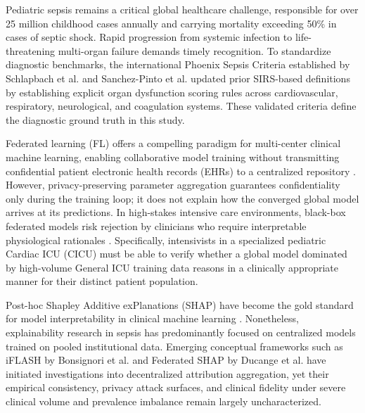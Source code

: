 \documentclass[runningheads]{llncs}
\begin{document}
Pediatric sepsis remains a critical global healthcare challenge, responsible for over 25 million childhood cases annually and carrying mortality exceeding 50\% in cases of septic shock. Rapid progression from systemic infection to life-threatening multi-organ failure demands timely recognition. To standardize diagnostic benchmarks, the international Phoenix Sepsis Criteria established by Schlapbach et al. \cite{schlapbach2024phoenix} and Sanchez-Pinto et al. \cite{sanchezpinto2024phoenix} updated prior SIRS-based definitions \cite{goldstein2005sirs} by establishing explicit organ dysfunction scoring rules across cardiovascular, respiratory, neurological, and coagulation systems. These validated criteria define the diagnostic ground truth in this study.

Federated learning (FL) offers a compelling paradigm for multi-center clinical machine learning, enabling collaborative model training without transmitting confidential patient electronic health records (EHRs) to a centralized repository \cite{mcmahan2017fedavg,li2020fedprox}. However, privacy-preserving parameter aggregation guarantees confidentiality only during the training loop; it does not explain how the converged global model arrives at its predictions. In high-stakes intensive care environments, black-box federated models risk rejection by clinicians who require interpretable physiological rationales \cite{athukorala2026explainable}. Specifically, intensivists in a specialized pediatric Cardiac ICU (CICU) must be able to verify whether a global model dominated by high-volume General ICU training data reasons in a clinically appropriate manner for their distinct patient population.

Post-hoc Shapley Additive exPlanations (SHAP) \cite{lundberg2017shap} have become the gold standard for model interpretability in clinical machine learning \cite{athukorala2026explainable,chanci2025machine}. Nonetheless, explainability research in sepsis has predominantly focused on centralized models trained on pooled institutional data. Emerging conceptual frameworks such as iFLASH by Bonsignori et al. \cite{bonsignori2026interpreting} and Federated SHAP by Ducange et al. \cite{ducange2026federated} have initiated investigations into decentralized attribution aggregation, yet their empirical consistency, privacy attack surfaces, and clinical fidelity under severe clinical volume and prevalence imbalance remain largely uncharacterized.
\end{document}
